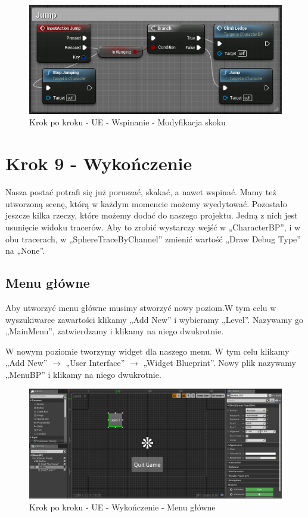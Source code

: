 \documentclass[12pt]{xmgr}
\begin{document}
\begin{figure}[!htb]
    \begin{center}
    \includegraphics[scale=0.5]{Screeny/UeKrokPoKroku/JumpClimb}
    \end{center}
    \caption{Krok po kroku - UE - Wspinanie - Modyfikacja skoku}
\end{figure}

\section{Krok 9 - Wykończenie}

Nasza postać potrafi się już poruszać, skakać, a nawet wspinać. Mamy też utworzoną scenę, którą w każdym momencie możemy wyedytować. Pozostało jeszcze kilka rzeczy, które możemy dodać do naszego projektu. Jedną z nich jest usunięcie widoku tracerów. Aby to zrobić wystarczy wejść w „CharacterBP”, i w obu tracerach, w „SphereTraceByChannel” zmienić wartość „Draw Debug Type” na „None”.

\subsection{Menu główne}

Aby utworzyć menu główne musimy stworzyć nowy poziom.W tym celu w wyszukiwarce zawartości klikamy „Add New” i wybieramy „Level”. Nazywamy go „MainMenu”, zatwierdzamy i klikamy na niego dwukrotnie. 

W nowym poziomie tworzymy widget dla naszego menu. W tym celu klikamy „Add New” $\rightarrow$ „User Interface” $\rightarrow$ „Widget Blueprint”. Nowy plik nazywamy „MenuBP” i klikamy na niego dwukrotnie.

\begin{figure}[!htb]
    \begin{center}
    \includegraphics[scale=0.35]{Screeny/UeKrokPoKroku/MainMenu}
    \end{center}
    \caption{Krok po kroku - UE - Wykończenie - Menu główne}
\end{figure}
\end{document}
